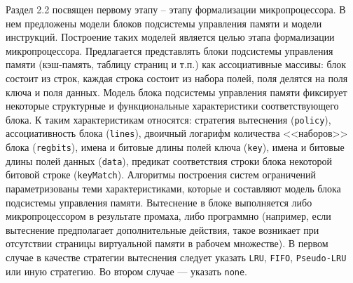 \documentclass[14pt,autoref,href
,facsimile
]{disser}
\begin{document}
Раздел 2.2 посвящен первому этапу -- этапу формализации микропроцессора. В нем предложены модели блоков подсистемы управления памяти и модели инструкций. Построение таких моделей является целью этапа формализации микропроцессора. Предлагается представлять блоки подсистемы управления памяти (кэш-память, таблицу страниц и т.п.) как ассоциативные массивы: блок состоит из строк, каждая строка состоит из набора полей, поля делятся на поля ключа и поля данных. Модель блока подсистемы управления памяти фиксирует некоторые структурные и функциональные характеристики соответствующего блока. К таким характеристикам относятся: стратегия вытеснения (\texttt{policy}), ассоциативность блока (\texttt{lines}), двоичный логарифм количества <<наборов>> блока (\texttt{regbits}), имена и битовые длины полей ключа (\texttt{key}), имена и битовые длины полей данных (\texttt{data}), предикат соответствия строки блока некоторой битовой строке (\texttt{keyMatch}). Алгоритмы построения систем ограничений параметризованы теми характеристиками, которые и составляют модель блока подсистемы управления памяти. Вытеснение в блоке выполняется либо микропроцессором в результате промаха, либо программно (например, если вытеснение предполагает дополнительные действия, такое возникает при отсутствии страницы виртуальной памяти в рабочем множестве). В первом случае в качестве стратегии вытеснения следует указать \texttt{LRU}, \texttt{FIFO}, \texttt{Pseudo-LRU} или иную стратегию. Во втором случае --- указать \texttt{none}.
\end{document}
